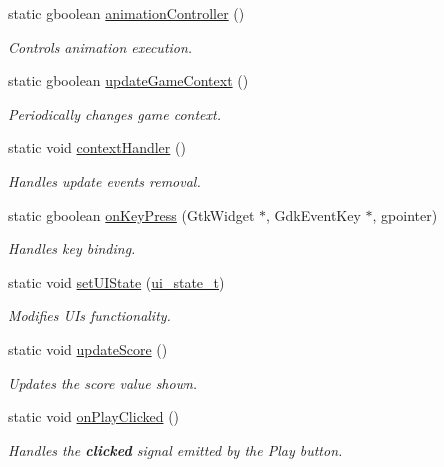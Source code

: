 \begin{DoxyCompactItemize}
static gboolean \hyperlink{classTetreesUI_adfb21fb6812e45bebe1e6e9b608786a0}{animation\+Controller} ()
\begin{DoxyCompactList}\small\item\em Controls animation execution. \end{DoxyCompactList}\item 
static gboolean \hyperlink{classTetreesUI_a0fe8ccb5c1c594792591036f4f02175f}{update\+Game\+Context} ()
\begin{DoxyCompactList}\small\item\em Periodically changes game context. \end{DoxyCompactList}\item 
static void \hyperlink{classTetreesUI_ae7d84906e943cd4b795800d4d561955c}{context\+Handler} ()
\begin{DoxyCompactList}\small\item\em Handles update event\textquotesingle{}s removal. \end{DoxyCompactList}\item 
static gboolean \hyperlink{classTetreesUI_ad940ec71d761d3234ee3cef397434784}{on\+Key\+Press} (Gtk\+Widget $\ast$, Gdk\+Event\+Key $\ast$, gpointer)
\begin{DoxyCompactList}\small\item\em Handles key binding. \end{DoxyCompactList}\item 
static void \hyperlink{classTetreesUI_a195806825b5469dcc99fbca5d14af94f}{set\+U\+I\+State} (\hyperlink{TetreesDefs_8hpp_ab583135648b1264a9f7817709c4dbd3e}{ui\+\_\+state\+\_\+t})
\begin{DoxyCompactList}\small\item\em Modifies UI\textquotesingle{}s functionality. \end{DoxyCompactList}\item 
static void \hyperlink{classTetreesUI_ac41bb9dc9af1d051c54dd5f2dcf224a9}{update\+Score} ()
\begin{DoxyCompactList}\small\item\em Updates the score value shown. \end{DoxyCompactList}\item 
static void \hyperlink{classTetreesUI_a0aa1932ac8f09f6d8de7ac7d7a2efa94}{on\+Play\+Clicked} ()
\begin{DoxyCompactList}\small\item\em Handles the {\bfseries clicked} signal emitted by the Play button. \end{DoxyCompactList}\item 

\end{DoxyCompactItemize}
